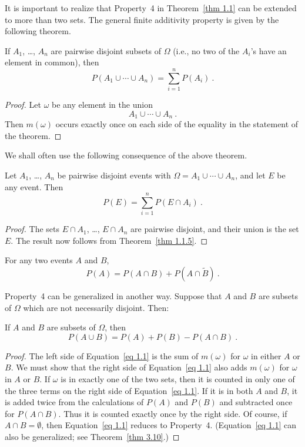 \par
It is important to realize that Property~4 in Theorem~\ref{thm 1.1} 
can be extended to more than two sets.  The general finite additivity
property is given by the following
theorem.\hfil\break
\begin{theorem}\label{thm 1.1.5}
\leanok
If $A_1$, \dots, $A_n$ are pairwise disjoint subsets of $\Omega$
(i.e., no two of the $A_i$'s have an element in common), then
$$
P(A_1 \cup \cdots \cup A_n) = \sum_{i = 1}^n P(A_i)\ .
$$
\end{theorem} 
\begin{proof}
\leanok
	Let $\omega$ be any element in the union
	$$A_1 \cup \cdots \cup A_n\ .$$
	Then $m(\omega)$ occurs exactly once on each side of the equality in the
	statement of the theorem.
\end{proof}
\par
We shall often use the following consequence of the above theorem.
\begin{theorem}\label{thm 1.2}
\leanok
 Let $A_1$, \dots, $A_n$ be pairwise disjoint events with $\Omega = A_1
\cup \cdots \cup A_n$, and let $E$ be any event.  Then
$$
P(E) = \sum_{i = 1}^n P(E \cap A_i)\ .
$$
\end{theorem}
\begin{proof}
\leanok
{}
	The sets $E \cap A_1$, \dots, $E \cap A_n$ are pairwise disjoint, and their 
	union is the set $E$.  The result now follows from Theorem~\ref{thm 1.1.5}.
\end{proof}
\begin{corollary}\label{cor 1.1}
For any two events $A$ and $B$,
$$
P(A) = P(A \cap B) + P(A \cap \tilde B)\ .
$$
\end{corollary}
\par
Property~4 can be generalized in another way.  Suppose that $A$ and $B$ are
subsets of $\Omega$ which are not necessarily disjoint.  Then:\hfil\break
\begin{theorem}\label{thm 1.2.5}
If $A$ and $B$ are subsets of $\Omega$, then
\begin{equation}
P(A \cup B) = P(A) + P(B) - P(A \cap B)\ .
\label{eq 1.1}
\end{equation}                                                                     
\end{theorem}
\begin{proof}
The left side of Equation~\ref{eq 1.1} is the sum of $m(\omega)$ for     
$\omega$ in either $A$ or $B$.  We must show that the right side of 
Equation~\ref{eq 1.1} also adds $m(\omega)$ for $\omega$ in $A$ or $B$. 
If $\omega$ is in exactly one of the two sets, then it is counted in only one
of the three terms on the right side of Equation~\ref{eq 1.1}.                
If it is in both $A$ and $B$, it is added twice from the calculations of
$P(A)$ and $P(B)$
and subtracted once for $P(A \cap B)$.  Thus it is counted exactly once by
the right side.  Of course, if $A \cap B = \emptyset$, then Equation~\ref{eq 1.1} 
reduces to Property~4.
(Equation~\ref{eq 1.1} can also be generalized; see Theorem~\ref{thm 3.10}.)  
\end{proof}

